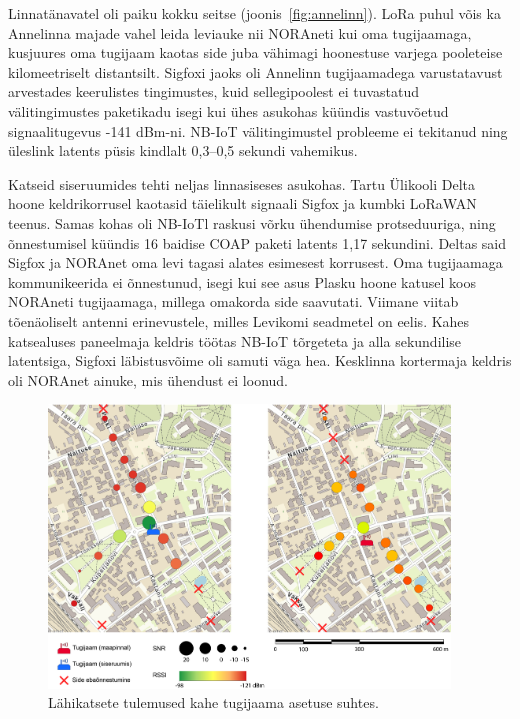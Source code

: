 \documentclass[12pt]{article}
\begin{document}
    Linnatänavatel oli paiku kokku seitse (joonis~\ref{fig:annelinn}).
    LoRa puhul võis ka Annelinna majade vahel leida leviauke nii NORAneti kui oma tugijaamaga, kusjuures oma tugijaam kaotas side juba vähimagi hoonestuse varjega pooleteise kilomeetriselt distantsilt.
    Sigfoxi jaoks oli Annelinn tugijaamadega varustatavust arvestades keerulistes tingimustes, kuid sellegipoolest ei tuvastatud välitingimustes paketikadu isegi kui ühes asukohas küündis vastuvõetud signaalitugevus -141 dBm-ni.
    NB-IoT välitingimustel probleeme ei tekitanud ning üleslink latents püsis kindlalt 0,3--0,5 sekundi vahemikus.


    Katseid siseruumides tehti neljas linnasiseses asukohas.
    Tartu Ülikooli Delta hoone keldrikorrusel kaotasid täielikult signaali Sigfox ja kumbki LoRaWAN teenus.
    Samas kohas oli NB-IoTl raskusi võrku ühendumise protseduuriga, ning õnnestumisel küündis 16 baidise COAP paketi latents 1,17 sekundini.
    Deltas said Sigfox ja NORAnet oma levi tagasi alates esimesest korrusest.
    Oma tugijaamaga kommunikeerida ei õnnestunud, isegi kui see asus Plasku hoone katusel koos NORAneti tugijaamaga, millega omakorda side saavutati.
    Viimane viitab tõenäoliselt antenni erinevustele, milles Levikomi seadmetel on eelis.
    Kahes katsealuses paneelmaja keldris töötas NB-IoT tõrgeteta ja alla sekundilise latentsiga, Sigfoxi läbistusvõime oli samuti väga hea.
    Kesklinna kortermaja keldris oli NORAnet ainuke, mis ühendust ei loonud.

    \begin{figure} [h]
        \begin{center}
            \includegraphics[width=0.95\textwidth]{figures/lahikatsed.png}
            \caption{Lähikatsete tulemused kahe tugijaama asetuse suhtes.}
            \label{fig:lahikatsed}
        \end{center}
    \end{figure}
\end{document}
